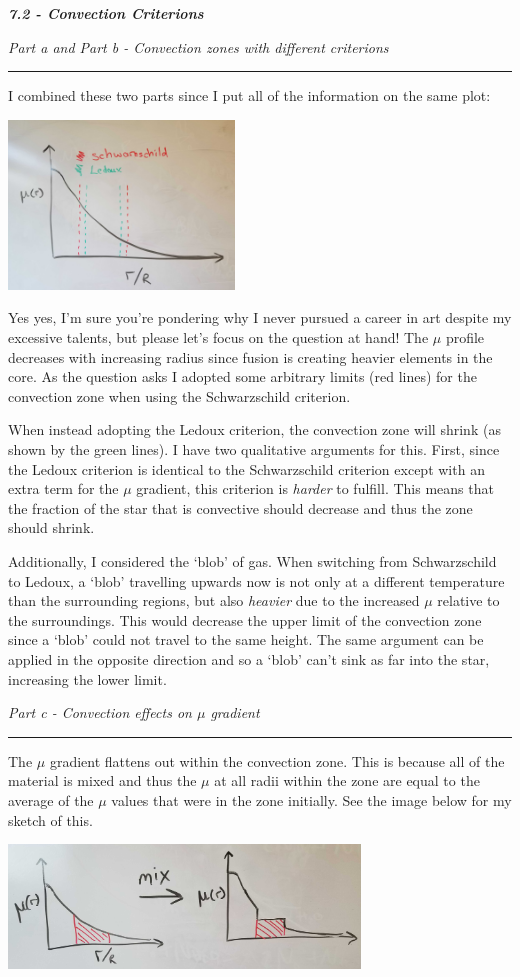 \documentclass[12pt, letterpaper, twoside]{article}
\newcommand{\question}[1]{{\noindent \it #1}}
\newcommand{\answer}[1]{
    \par\noindent\rule{\textwidth}{0.4pt}#1\vspace{0.5cm}
}
\begin{document}
\question{\textbf{7.2 - Convection Criterions}}

\question{Part a and Part b - Convection zones with different criterions}
\answer{
    I combined these two parts since I put all of the information on the same plot:
    \begin{center}
        \includegraphics[width=0.45\textwidth]{figures/criterion_shift_zones.jpg}
    \end{center}
    Yes yes, I'm sure you're pondering why I never pursued a career in art despite my excessive talents, but please let's focus on the question at hand! The $\mu$ profile decreases with increasing radius since fusion is creating heavier elements in the core. As the question asks I adopted some arbitrary limits (red lines) for the convection zone when using the Schwarzschild criterion.

    When instead adopting the Ledoux criterion, the convection zone will shrink (as shown by the green lines). I have two qualitative arguments for this. First, since the Ledoux criterion is identical to the Schwarzschild criterion except with an extra term for the $\mu$ gradient, this criterion is \textit{harder} to fulfill. This means that the fraction of the star that is convective should decrease and thus the zone should shrink.

    Additionally, I considered the `blob' of gas. When switching from Schwarzschild to Ledoux, a `blob' travelling upwards now is not only at a different temperature than the surrounding regions, but also \textit{heavier} due to the increased $\mu$ relative to the surroundings. This would decrease the upper limit of the convection zone since a `blob' could not travel to the same height. The same argument can be applied in the opposite direction and so a `blob' can't sink as far into the star, increasing the lower limit.
}

\question{Part c - Convection effects on $\mu$ gradient}
\answer{
    The $\mu$ gradient flattens out within the convection zone. This is because all of the material is mixed and thus the $\mu$ at all radii within the zone are equal to the average of the $\mu$ values that were in the zone initially. See the image below for my sketch of this.
    \begin{center}
        \includegraphics[width=0.7\textwidth]{figures/mixing.jpg}
    \end{center}
}
\end{document}
